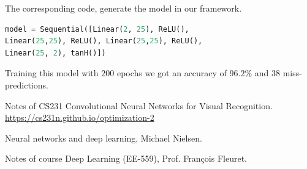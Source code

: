 \documentclass[journal, a4paper]{IEEEtran}
\begin{document}
The corresponding code, generate the model in our framework.
\begin{lstlisting}[language=Python]
model = Sequential([Linear(2, 25), ReLU(),
Linear(25,25), ReLU(), Linear(25,25), ReLU(),
Linear(25, 2), tanH()])
\end{lstlisting}
Training this model with $200$ epochs we got an accuracy of $96.2\%$ and $38$ miss-predictions.

\begin{thebibliography}{999}

    	Notes of CS231 Convolutional Neural Networks for Visual Recognition.
    	\url{https://cs231n.github.io/optimization-2}
	
	    Neural networks and deep learning, Michael Nielsen.
	    
    Notes of course Deep Learning (EE-559), Prof. François Fleuret.

\end{thebibliography}

\end{document}
